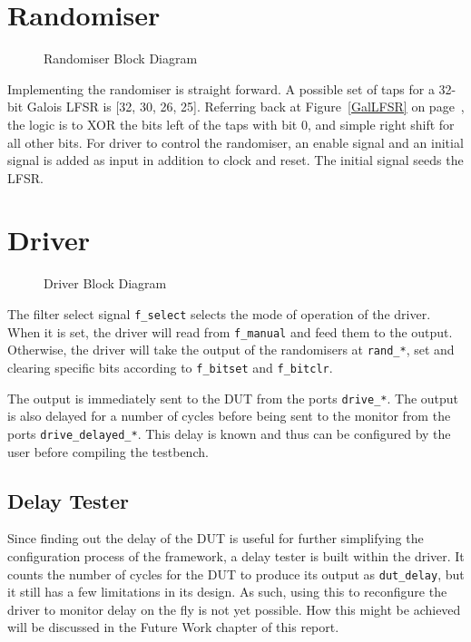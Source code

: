 \section{Randomiser}

\begin{figure}[H]
  \centering
  
  \caption{Randomiser Block Diagram}
  \label{RandomiserBlk}
\end{figure}

Implementing the randomiser is straight forward.
A possible set of taps for a 32-bit Galois LFSR is [32, 30, 26, 25].
Referring back at Figure~\ref{GalLFSR} on page~\pageref{GalLFSR},
the logic is to XOR the bits left of the taps with bit 0, and simple right shift for all other bits.
For driver to control the randomiser, an enable signal and an initial signal is added as input in addition to clock and reset.
The initial signal seeds the LFSR.

\section{Driver}

\begin{figure}[H]
  \centering
  
  \caption{Driver Block Diagram}
  \label{DriverBlk}
\end{figure}

The filter select signal \texttt{f\_select} selects the mode of operation of the driver.
When it is set, the driver will read from \texttt{f\_manual} and feed them to the output.
Otherwise, the driver will take the output of the randomisers at \texttt{rand\_*}, set and clearing specific bits according to \texttt{f\_bitset} and \texttt{f\_bitclr}.

The output is immediately sent to the DUT from the ports \texttt{drive\_*}.
The output is also delayed for a number of cycles before being sent to the monitor from the ports \texttt{drive\_delayed\_*}.
This delay is known and thus can be configured by the user before compiling the testbench.

\subsection{Delay Tester}

Since finding out the delay of the DUT is useful for further simplifying the configuration process of the framework, a delay tester is built within the driver.
It counts the number of cycles for the DUT to produce its output as \texttt{dut\_delay}, but it still has a few limitations in its design.
As such, using this to reconfigure the driver to monitor delay on the fly is not yet possible.
How this might be achieved will be discussed in the Future Work chapter of this report.

